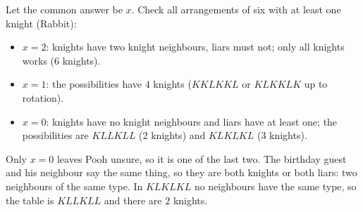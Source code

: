 Let the common answer be $x$. Check all arrangements of six with at least one knight (Rabbit):
\begin{itemize}
\item $x=2$: knights have two knight neighbours, liars must not; only all knights works ($6$ knights).
\item $x=1$: the possibilities have $4$ knights ($KKLKKL$ or $KLKKLK$ up to rotation).
\item $x=0$: knights have no knight neighbours and liars have at least one; the possibilities are $KLLKLL$ ($2$ knights) and $KLKLKL$ ($3$ knights).
\end{itemize}
Only $x=0$ leaves Pooh unsure, so it is one of the last two. The birthday guest and his neighbour say the same thing, so they are both knights or both liars: two neighbours of the same type. In $KLKLKL$ no neighbours have the same type, so the table is $KLLKLL$ and there are $\boxed{2}$ knights.
